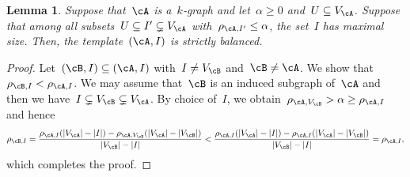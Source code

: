 \documentclass[11pt]{amsart}
\DeclarePairedDelimiter{\abs}{\lvert}{\rvert}
\newtheorem{lemma}[algocf]{Lemma}
\theoremstyle{definition}
\numberwithin{equation}{section}
\begin{document}
	\begin{lemma}\label{lemma: extension is strictly balanced}
		Suppose that~$\cA$ is a~$k$-graph and let~$\alpha\geq 0$ and~$U\subseteq V_\cA$.
		Suppose that among all subsets~$U\subseteq I'\subsetneq V_\cA$ with~$\rho_{\cA,I'}\leq \alpha$, the set~$I$ has maximal size.
		Then, the template~$(\cA,I)$ is strictly balanced.
	\end{lemma}
	\begin{proof}
		Let~$(\cB,I)\subseteq (\cA,I)$ with~$I\neq V_\cB$ and~$\cB\neq\cA$.
		We show that~$\rho_{\cB,I}<\rho_{\cA,I}$.
		We may assume that~$\cB$ is an induced subgraph of~$\cA$ and then we have~$I\subsetneq V_\cB\subsetneq V_\cA$.
		By choice of~$I$, we obtain~$\rho_{\cA,V_\cB}>\alpha\geq \rho_{\cA,I}$ and hence
		\begin{equation*}
			\rho_{\cB,I}
			=\frac{\rho_{\cA,I}(\abs{V_\cA}-\abs{I})-\rho_{\cA,V_\cB}(\abs{V_\cA}-\abs{V_\cB})}{\abs{V_\cB}-\abs{I}}
			<\frac{\rho_{\cA,I}(\abs{V_\cA}-\abs{I})-\rho_{\cA,I}(\abs{V_\cA}-\abs{V_\cB})}{\abs{V_\cB}-\abs{I}}
			=\rho_{\cA,I},
		\end{equation*}
		which completes the proof.
	\end{proof}
	
\end{document}
